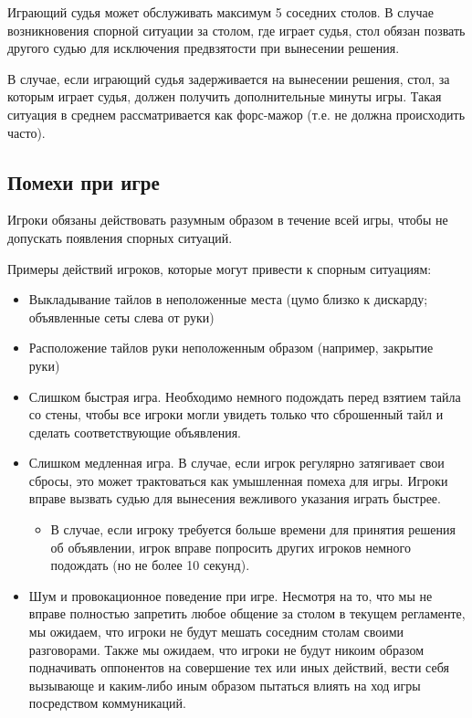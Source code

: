 Играющий судья может обслуживать максимум 5 соседних столов. В случае возникновения спорной ситуации за столом, где играет судья, стол обязан позвать другого судью для исключения предвзятости при вынесении решения. 

В случае, если играющий судья задерживается на вынесении решения, стол, за которым играет судья, должен получить дополнительные минуты игры. Такая ситуация в среднем рассматривается как форс-мажор (т.е. не должна происходить часто).

\subsection{Помехи при игре}

Игроки обязаны действовать разумным образом в течение всей игры, чтобы не допускать появления спорных ситуаций.

Примеры действий игроков, которые могут привести к спорным ситуациям:
\begin{itemize}
	\item Выкладывание тайлов в неположенные места (цумо близко к дискарду; объявленные сеты слева от руки)
	\item Расположение тайлов руки неположенным образом (например, закрытие руки)
	\item Слишком быстрая игра. Необходимо немного подождать перед взятием тайла со стены, чтобы все игроки могли увидеть только что сброшенный тайл и сделать соответствующие объявления.
	\item Слишком медленная игра. В случае, если игрок регулярно затягивает свои сбросы, это может трактоваться как умышленная помеха для игры. Игроки вправе вызвать судью для вынесения вежливого указания играть быстрее.
	\begin{itemize}
		\item В случае, если игроку требуется больше времени для принятия решения об объявлении, игрок вправе попросить других игроков немного подождать (но не более 10 секунд).
	\end{itemize}
	\item Шум и провокационное поведение при игре. Несмотря на то, что мы не вправе полностью запретить любое общение за столом в текущем регламенте, мы ожидаем, что игроки не будут мешать соседним столам своими разговорами. Также мы ожидаем, что игроки не будут никоим образом подначивать оппонентов на совершение тех или иных действий, вести себя вызывающе и каким-либо иным образом пытаться влиять на ход игры посредством коммуникаций.
\end{itemize}

